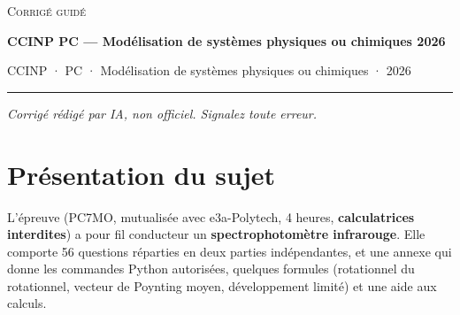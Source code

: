 \documentclass[11pt,a4paper]{article}
\begin{document}
\thispagestyle{plain}
\begin{center}
  {\small\scshape Corrigé guidé}\par\smallskip
  {\LARGE\bfseries CCINP PC — Modélisation de systèmes physiques ou chimiques 2026\par}\medskip
  {\large CCINP · PC · Modélisation de systèmes physiques ou chimiques · 2026\par}
\end{center}
\vspace{2pt}\hrule\vspace{8pt}

\emph{Corrigé rédigé par IA, non officiel. Signalez toute erreur.}

\hypertarget{pruxe9sentation-du-sujet}{%
\section{Présentation du sujet}\label{pruxe9sentation-du-sujet}}

L'épreuve (PC7MO, mutualisée avec e3a-Polytech, 4 heures, \textbf{calculatrices interdites}) a pour fil conducteur un \textbf{spectrophotomètre infrarouge}. Elle comporte 56 questions réparties en deux parties indépendantes, et une annexe qui donne les commandes Python autorisées, quelques formules (rotationnel du rotationnel, vecteur de Poynting moyen, développement limité) et une aide aux calculs.
\end{document}
